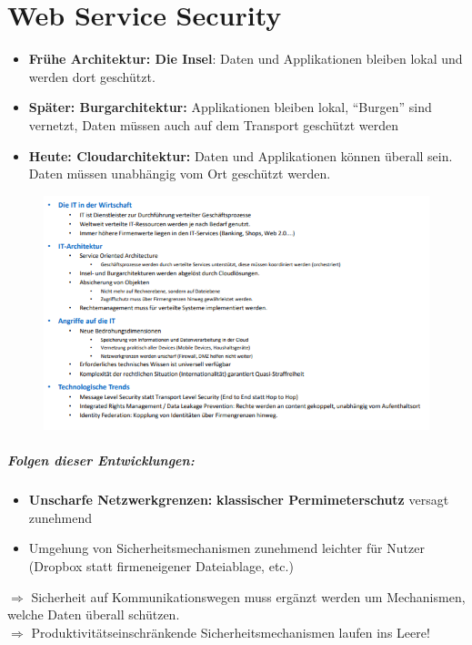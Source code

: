\chapter{Web Service Security}
\begin{itemize}
	\item \textbf{Frühe Architektur: Die Insel}: Daten und Applikationen bleiben lokal und werden dort geschützt.
	\item \textbf{Später: Burgarchitektur:} Applikationen bleiben lokal, \enquote{Burgen} sind vernetzt, Daten müssen auch auf dem Transport geschützt werden
	\item \textbf{Heute: Cloudarchitektur:} Daten und Applikationen können überall sein. Daten müssen unabhängig vom Ort geschützt werden.
\end{itemize}
\begin{figure}[H]
	\begin{center}
		\includegraphics[scale=0.8]{Resources/itsicherheit}
		\caption{}
		\label{fig:itsicherheit}
	\end{center}
\end{figure}

\paragraph{Folgen dieser Entwicklungen:}
\begin{itemize}
	\item \textbf{Unscharfe Netzwerkgrenzen:} \textbf{klassischer Permimeterschutz} versagt zunehmend
	\item Umgehung von Sicherheitsmechanismen zunehmend leichter für Nutzer (Dropbox statt firmeneigener Dateiablage, etc.)
\end{itemize}
$\Rightarrow$ Sicherheit auf Kommunikationswegen muss ergänzt werden um Mechanismen, welche Daten überall schützen.\\
$\Rightarrow$ Produktivitätseinschränkende Sicherheitsmechanismen laufen ins Leere!

